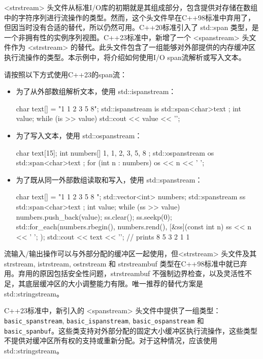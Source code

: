 
<strstream> 头文件从标准I/O库的初期就是其组成部分，包含提供对存储在数组中的字符序列进行流操作的类型。然而，这个头文件早在C++98标准中弃用了，但因当时没有合适的替代，所以仍然可用。C++20标准引入了 std::span 类型，是一个非拥有性的实例序列视图。C++23标准中，新增了一个 <spanstream> 头文件作为 <strstream> 的替代。此头文件包含了一组能够对外部提供的内存缓冲区执行流操作的类型。本示例中，将介绍如何使用I/O span流解析或写入文本。


请按照以下方式使用C++23的span流：

\begin{itemize}
\item
为了从外部数组解析文本，使用 std::ispanstream：

\begin{cpp}
char text[] = "1 1 2 3 5 8";
std::ispanstream is{ std::span<char>{text} };
int value;
while (is >> value)
{
    std::cout << value << '\n';
}
\end{cpp}

\item
为了写入文本，使用 std::ospanstream：

\begin{cpp}
char text[15]{};
int numbers[]{ 1, 1, 2, 3, 5, 8 };
std::ospanstream os{ std::span<char>{text} };
for (int n : numbers)
{
    os << n << ' ';
}
\end{cpp}

\item
为了既从同一外部数组读取和写入，使用 std::spanstream：

\begin{cpp}
char text[] = "1 1 2 3 5 8 ";
std::vector<int> numbers;
std::spanstream ss{ std::span<char>{text} };
int value;
while (ss >> value)
{
    numbers.push_back(value);
}
ss.clear();
ss.seekp(0);
std::for_each(numbers.rbegin(), numbers.rend(),
[&ss](const int n) { ss << n << ' '; });
std::cout << text << '\n'; // prints 8 5 3 2 1 1
\end{cpp}
\end{itemize}


流输入/输出操作可以与外部分配的缓冲区一起使用，但<strstream> 头文件及其 strstream, istrstream, ostrstream 和 strstreambuf 类型在C++98标准中就已弃用。弃用的原因包括安全性问题，strstreambuf 不强制边界检查，以及灵活性不足，其底层缓冲区的大小调整能力有限。唯一推荐的替代方案是 std::stringstream。

C++23标准中，新引入的 <spanstream> 头文件中提供了一组类型：\verb|basic_spanstream|, \verb|basic_ispanstream|, \verb|basic_ospanstream| 和 \verb|basic_spanbuf|。这些类支持对外部分配的固定大小缓冲区执行流操作，这些类型不提供对缓冲区所有权的支持或重新分配。对于这种情况，应该使用 std::stringstream。

